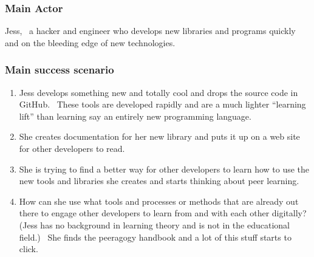 \subsubsection{Main Actor}

Jess,~ a hacker and engineer who develops new libraries and programs
quickly and on the bleeding edge of new technologies.

\subsubsection{Main success scenario}

\begin{enumerate}
\item
  Jess develops something new and totally cool and drops the source code
  in GitHub.~ These tools are developed rapidly and are a much lighter
  ``learning lift'' than learning say an entirely new programming
  language.
\item
  She creates documentation for her new library and puts it up on a web
  site for other developers to read.
\item
  She is trying to find a better way for other developers to learn how
  to use the new tools and libraries she creates and starts thinking
  about peer learning.
\item
  How can she use what tools and processes or methods that are already
  out there to engage other developers to learn from and with each other
  digitally? (Jess has no background in learning theory and is not in
  the educational field.)~ She finds the peeragogy handbook and a lot of
  this stuff starts to click.
\end{enumerate}
